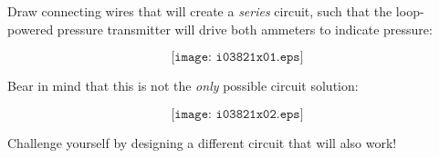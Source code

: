 

Draw connecting wires that will create a {\it series} circuit, such that the loop-powered pressure transmitter will drive both ammeters to indicate pressure:

$$\texttt{[image: i03821x01.eps]}$$







Bear in mind that this is not the {\it only} possible circuit solution:

$$\texttt{[image: i03821x02.eps]}$$

Challenge yourself by designing a different circuit that will also work! 










